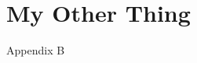 %
%
%



\pagestyle{plain}
\appendix
\setcounter{chapter}{1}

\chapter{My Other Thing}
\renewcommand{\thetable}{\Alph{chapter}.\arabic{table}}  
\renewcommand{\thefigure}{\Alph{chapter}.\arabic{figure}} 

Appendix B